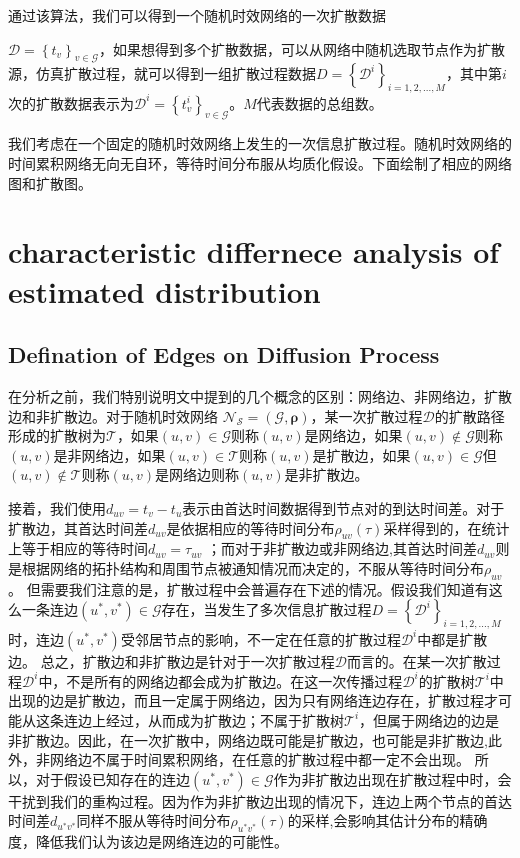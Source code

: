 \documentclass[journal]{IEEEtran}
\begin{document}
		通过该算法，我们可以得到一个随机时效网络的一次扩散数据{$\mathcal{D}=\left\{t_v\right\}_{v\in \mathcal{G}}$，如果想得到多个扩散数据，可以从网络中随机选取节点作为扩散源，仿真扩散过程，就可以得到一组扩散过程数据$D=\left\{\mathcal{D}^i\right\}_{i=1,2,...,M}$，其中第$i$次的扩散数据表示为$\mathcal{D}^i=\left\{t_v^i\right\}_{v\in \mathcal{G}}$。$M$代表数据的总组数。
		
		我们考虑在一个固定的随机时效网络上发生的一次信息扩散过程。随机时效网络的时间累积网络无向无自环，等待时间分布服从均质化假设。下面绘制了相应的网络图和扩散图。
		
	
	\section{characteristic differnece analysis of estimated distribution}	
		\subsection{Defination of Edges on Diffusion Process }
		在分析之前，我们特别说明文中提到的几个概念的区别：网络边、非网络边，扩散边和非扩散边。对于随机时效网络 $\mathcal{N_S=(G,\bm{\rho})}$，某一次扩散过程$\mathcal{D}$的扩散路径形成的扩散树为$\mathcal{T}$，如果$(u,v)\in \mathcal{G}$则称$(u,v)$是网络边，如果$(u,v)\notin \mathcal{G}$则称$(u,v)$是非网络边，如果$(u,v)\in \mathcal{T}$则称$(u,v)$是扩散边，如果$(u,v)\in \mathcal{G}$但$(u,v)\notin \mathcal{T}$则称$(u,v)$是网络边则称$(u,v)$是非扩散边。
		
		接着，我们使用$d_{uv}=t_v-t_u$表示由首达时间数据得到节点对的到达时间差。对于扩散边，其首达时间差$d_{uv}$是依据相应的等待时间分布$\rho_{uv}(\tau)$采样得到的，在统计上等于相应的等待时间$d_{uv}=\tau_{uv}$ ；而对于非扩散边或非网络边,其首达时间差$d_{uv}$则是根据网络的拓扑结构和周围节点被通知情况而决定的，不服从等待时间分布$\rho_{uv}$。
		但需要我们注意的是，扩散过程中会普遍存在下述的情况。假设我们知道有这么一条连边$(u^*,v^*)\in \mathcal{G}$存在，当发生了多次信息扩散过程$D=\left\{ \mathcal{D}^i\right\}_{i=1,2,...,M}$时，连边$(u^*,v^*)$受邻居节点的影响，不一定在任意的扩散过程$\mathcal{D}^i$中都是扩散边。
		总之，扩散边和非扩散边是针对于一次扩散过程$\mathcal{D}$而言的。在某一次扩散过程$\mathcal{D}^i$中，不是所有的网络边都会成为扩散边。在这一次传播过程$\mathcal{D}^i$的扩散树$\mathcal{T}^i$中出现的边是扩散边，而且一定属于网络边，因为只有网络连边存在，扩散过程才可能从这条连边上经过，从而成为扩散边；不属于扩散树$\mathcal{T}^i$，但属于网络边的边是非扩散边。因此，在一次扩散中，网络边既可能是扩散边，也可能是非扩散边,此外，非网络边不属于时间累积网络，在任意的扩散过程中都一定不会出现。
		所以，对于假设已知存在的连边$(u^*,v^*)\in \mathcal{G}$作为非扩散边出现在扩散过程中时，会干扰到我们的重构过程。因为作为非扩散边出现的情况下，连边上两个节点的首达时间差$d_{u^*v^*}$同样不服从等待时间分布$\rho_{u^*v^*}(\tau)$的采样,会影响其估计分布的精确度，降低我们认为该边是网络连边的可能性。
		
}
\end{document}
